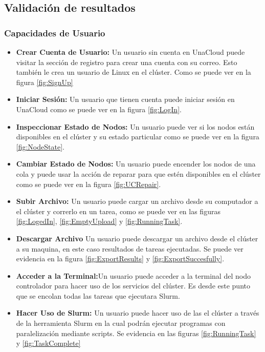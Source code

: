 \subsection{Validación de resultados}
\subsubsection{Capacidades de Usuario}
\begin{itemize}
    \item \textbf{Crear Cuenta de Usuario:} Un usuario sin cuenta en UnaCloud puede visitar la sección de registro para crear una cuenta con su correo. Esto también le crea un usuario de Linux en el clúster. Como se puede ver en la figura \ref{fig:SignUp}
    \item \textbf{Iniciar Sesión:} Un usuario que tienen cuenta puede iniciar sesión en UnaCloud como se puede ver en la figura \ref{fig:LogIn}. 
    \item \textbf{Inspeccionar Estado de Nodos:} Un usuario puede ver si los nodos están disponibles en el clúster y su estado particular como se puede ver en la figura \ref{fig:NodeState}.
    \item \textbf{Cambiar Estado de Nodos:} Un usuario puede encender los nodos de una cola y puede usar la acción de reparar para que estén disponibles en el clúster como se puede ver en la figura \ref{fig:UCRepair}.
    \item \textbf{Subir Archivo:} Un usuario puede cargar un archivo desde su computador a el clúster y correrlo en un tarea, como se puede ver en las figuras \ref{fig:LogedIn}, \ref{fig:EmptyUpload} y \ref{fig:RunningTask}.
    \item \textbf{Descargar Archivo}
    Un usuario puede descargar un archivo desde el clúster a su maquina, en este caso resultados de tareas ejecutadas. Se puede ver evidencia en la figura \ref{fig:ExportResults} y \ref{fig:ExportSuccesfully}.
    \item \textbf{Acceder a la Terminal:}Un usuario puede acceder a la terminal del nodo controlador para hacer uso de los servicios del clúster. Es desde este punto que se encolan todas las tareas que ejecutara Slurm.
    \item \textbf{Hacer Uso de Slurm:} Un usuario puede hacer uso de las el clúster a través de la herramienta Slurm en la cual podrán ejecutar programas con paralelización mediante scripts. Se evidencia en las figuras \ref{fig:RunningTask} y \ref{fig:TaskComplete}
\end{itemize} 